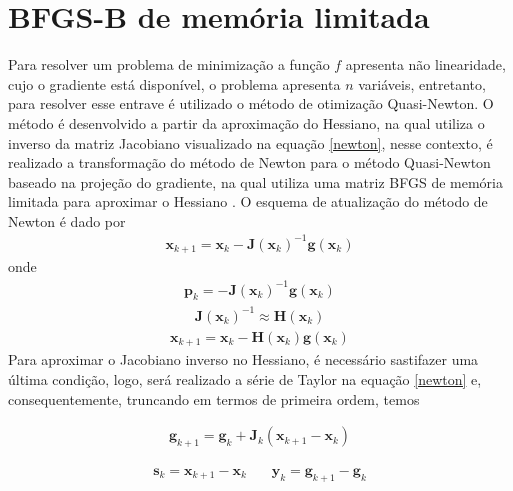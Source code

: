 \chapter{BFGS-B de memória limitada}

Para resolver um problema de minimização a função $f$ apresenta não linearidade, cujo o gradiente está disponível, o problema  apresenta $n$ variáveis, entretanto, para resolver esse entrave é utilizado o método de otimização Quasi-Newton. O método é desenvolvido a partir da aproximação do Hessiano, na qual utiliza o inverso da matriz Jacobiano visualizado na equação \ref{newton}, nesse contexto, é realizado a transformação do método de Newton para o método Quasi-Newton baseado na projeção do gradiente, na qual utiliza uma matriz BFGS de memória limitada para aproximar o Hessiano \citep{nocedal_2006}. O esquema de atualização do método de Newton é dado por 
\begin{eqnarray}
\nonumber
          \mathbf{x}_{k+1}= \mathbf{x}_{k}- \mathbf{J}\left( \mathbf{x}_{k}\right)^{-1}  \mathbf{g}\left( \mathbf{x}_{k}\right) 
\end{eqnarray}
onde
\begin{eqnarray}
\nonumber
 \mathbf{p}_{k} =  - \mathbf{J}\left( \mathbf{x}_{k}\right)^{-1} \mathbf{g}\left( \mathbf{x}_{k}\right)
\end{eqnarray}
\begin{eqnarray}
\nonumber
 \mathbf{J}\left( \mathbf{x}_{k}\right)^{-1} \approx  \mathbf{H}\left( \mathbf{x}_{k}\right) 
\end{eqnarray}
\begin{eqnarray}
      \mathbf{x}_{k+1}= \mathbf{x}_{k}- \mathbf{H}\left( \mathbf{x}_{k}\right)   \mathbf{g}\left( \mathbf{x}_{k}\right) 
 \label{newton}
\end{eqnarray}
Para aproximar o Jacobiano inverso no Hessiano, é necessário sastifazer uma última condição, logo, será realizado a série de Taylor na equação \ref{newton} e, consequentemente, truncando em termos de primeira ordem, temos

\begin{eqnarray}
        \mathbf{g}_{k+1} =  \mathbf{g}_{k} +  \mathbf{J}_{k}\left( \mathbf{x}_{k+1} -  \mathbf{x}_{k} \right)
\end{eqnarray}

\begin{eqnarray}
 \mathbf{s}_{k} =  \mathbf{x}_{k+1} -  \mathbf{x}_{k} ~~~~~~~~  \mathbf{y}_{k} =  \mathbf{g}_{k+1} -  \mathbf{g}_{k}
\label{skyk}
 \end{eqnarray}

